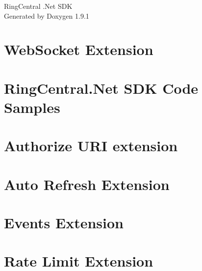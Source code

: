 \let\mypdfximage\pdfximage\def\pdfximage{\immediate\mypdfximage}\documentclass[twoside]{book}
\newcommand{\+}{\discretionary{\mbox{\scriptsize$\hookleftarrow$}}{}{}}
\newcommand{\clearemptydoublepage}{%
  \newpage{\pagestyle{empty}\cleardoublepage}%
}
\begin{document}
\raggedbottom

\hypersetup{pageanchor=false,
             bookmarksnumbered=true,
             pdfencoding=unicode
            }
\begin{titlepage}
\vspace*{7cm}
\begin{center}%
{\Large Ring\+Central .Net SDK }\\
\vspace*{1cm}
{\large Generated by Doxygen 1.9.1}\\
\end{center}
\end{titlepage}
\clearemptydoublepage
{}
\tableofcontents
\clearemptydoublepage
{}
\hypersetup{pageanchor=true}

\chapter{Web\+Socket Extension}
\label{md_RingCentral_Net_WebSocket_README}

\chapter{Ring\+Central.\+Net SDK Code Samples}
\label{md_RingCentral_Net_samples}

\chapter{Authorize URI extension}
\label{md_RingCentral_Net_AuthorizeUri_README}

\chapter{Auto Refresh Extension}
\label{md_RingCentral_Net_AutoRefresh_README}

\chapter{Events Extension}
\label{md_RingCentral_Net_Events_README}

\chapter{Rate Limit Extension}
\label{md_RingCentral_Net_RateLimit_README}

\end{document}
